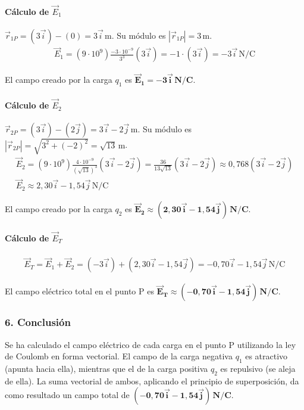 \paragraph*{Cálculo de $\vec{E}_1$}
$\vec{r}_{1P} = (3\vec{i}) - (0) = 3\vec{i}\,\text{m}$. Su módulo es $|\vec{r}_{1P}| = 3\,\text{m}$.
\begin{gather}
    \vec{E}_1 = (9\cdot10^9) \frac{-3\cdot10^{-9}}{3^3} (3\vec{i}) = -1 \cdot (3\vec{i}) = -3\vec{i}\,\text{N/C}
\end{gather}
\begin{cajaresultado}
    El campo creado por la carga $q_1$ es $\boldsymbol{\vec{E}_1 = -3\vec{i}\,\textbf{N/C}}$.
\end{cajaresultado}
\paragraph*{Cálculo de $\vec{E}_2$}
$\vec{r}_{2P} = (3\vec{i}) - (2\vec{j}) = 3\vec{i} - 2\vec{j}\,\text{m}$. Su módulo es $|\vec{r}_{2P}| = \sqrt{3^2 + (-2)^2} = \sqrt{13}\,\text{m}$.
\begin{gather}
    \vec{E}_2 = (9\cdot10^9) \frac{4\cdot10^{-9}}{(\sqrt{13})^3} (3\vec{i} - 2\vec{j}) = \frac{36}{13\sqrt{13}} (3\vec{i} - 2\vec{j}) \approx 0,768 (3\vec{i} - 2\vec{j}) \nonumber \\
    \vec{E}_2 \approx 2,30\vec{i} - 1,54\vec{j}\,\text{N/C}
\end{gather}
\begin{cajaresultado}
    El campo creado por la carga $q_2$ es $\boldsymbol{\vec{E}_2 \approx (2,30\vec{i} - 1,54\vec{j})\,\textbf{N/C}}$.
\end{cajaresultado}
\paragraph*{Cálculo de $\vec{E}_T$}
\begin{gather}
    \vec{E}_T = \vec{E}_1 + \vec{E}_2 = (-3\vec{i}) + (2,30\vec{i} - 1,54\vec{j}) = -0,70\vec{i} - 1,54\vec{j}\,\text{N/C}
\end{gather}
\begin{cajaresultado}
    El campo eléctrico total en el punto P es $\boldsymbol{\vec{E}_T \approx (-0,70\vec{i} - 1,54\vec{j})\,\textbf{N/C}}$.
\end{cajaresultado}

\subsubsection*{6. Conclusión}
\begin{cajaconclusion}
Se ha calculado el campo eléctrico de cada carga en el punto P utilizando la ley de Coulomb en forma vectorial. El campo de la carga negativa $q_1$ es atractivo (apunta hacia ella), mientras que el de la carga positiva $q_2$ es repulsivo (se aleja de ella). La suma vectorial de ambos, aplicando el principio de superposición, da como resultado un campo total de $\mathbf{(-0,70\vec{i} - 1,54\vec{j})\,N/C}$.
\end{cajaconclusion}

